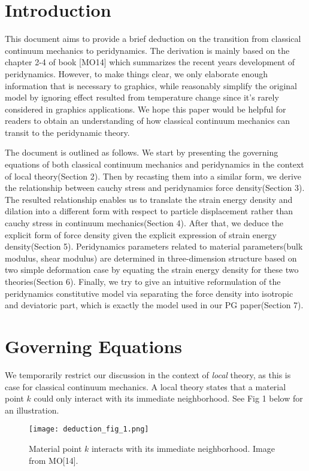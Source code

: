 \documentclass[a4paper,11pt,CJK]{paper}
\begin{document}
\section{Introduction}
This document aims to provide a brief deduction on the transition from classical continuum mechanics to peridynamics.
The derivation is mainly based on the chapter 2-4 of  book [MO14] which summarizes the recent years development of peridynamics.
However, to make things clear, we only elaborate enough information that is necessary to graphics, while reasonably simplify the original model by ignoring
effect resulted from temperature change since it's rarely considered in graphics applications.
We hope this paper would be helpful for readers to obtain an understanding of how classical continuum mechanics can transit to the peridynamic theory.

The document is outlined as follows.
We start by presenting the governing equations of both classical continuum mechanics and peridynamics in the context of local theory(Section 2).
Then by recasting them into a similar form, we derive the relationship between cauchy stress and peridynamics force density(Section 3).
The resulted relationship enables us to translate the strain energy density and dilation into a different form with respect to particle displacement rather than cauchy stress in continuum mechanics(Section 4).
After that, we deduce the explicit form of force density given the explicit expression of strain energy density(Section 5).
Peridynamics parameters related to material parameters(bulk modulus, shear modulus) are determined in three-dimension structure based on two simple deformation case by equating the strain energy density for these two theories(Section 6).
Finally, we try to give an intuitive reformulation of the peridynamics constitutive model via separating the force density into isotropic and deviatoric part, which is exactly the model used in our PG paper(Section 7).

\section{Governing Equations}
We temporarily restrict our discussion in the context of \textit{local} theory, as this is case for classical continuum mechanics.
A local theory states that a material point $k$ could only interact with its immediate neighborhood. See Fig 1 below for an illustration.
\begin{figure}[!h]
\center
\texttt{[image: deduction\_fig\_1.png]}
\caption{Material point $k$ interacts with its immediate neighborhood. Image from MO[14].}
\end{figure}
\end{document}
